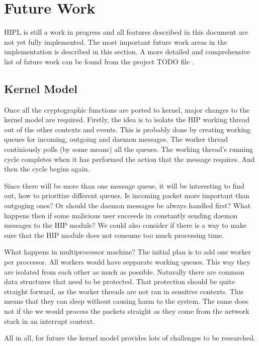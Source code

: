 \section{Future Work}
\label{sec:future_work}

HIPL is still a work in progress and all features described in this
document are not yet fully implemented. The most important future work
areas in the implementation is described in this section. A more
detailed and comprehensive list of future work can be found from the
project TODO file \cite{hipl}.

\subsection{Kernel Model}
\label{sec:kernel_model_future_work}

Once all the cryptographic functions are ported to kernel, major
changes to the kernel model are required. Firstly, the idea is to
isolate the HIP working thread out of the other contexts and
events. This is probably done by creating working queues for incoming,
outgoing and daemon messages.  The worker thread continiously polls
(by some means) all the queues.  The working thread's running cycle
completes when it has performed the action that the message
requires. And then the cycle begins again.

Since there will be more than one message queue, it will be
interesting to find out, how to prioritize different queues. Is
incoming packet more important than outgoging ones? Or should the
daemon messages be always handled first? What happens then if some
malicious user succeeds in constantly sending daemon messages to the
HIP module?  We could also consider if there is a way to make sure
that the HIP module does not consume too much processing time.

What happens in multiprocessor machine? The initial plan is to add one
worker per processor. All workers would have sepparate working queues.
This way they are isolated from each other as much as possible.
Naturally there are common data structures that need to be protected.
That protection should be quite straight forward, as the worker
threads are not ran in sensitive contexts. This means that they can
sleep without causing harm to the system. The same does not if the we
would process the packets straight as they come from the network stack
in an interrupt context.

All in all, for future the kernel model provides lots of challenges to
be researched.

